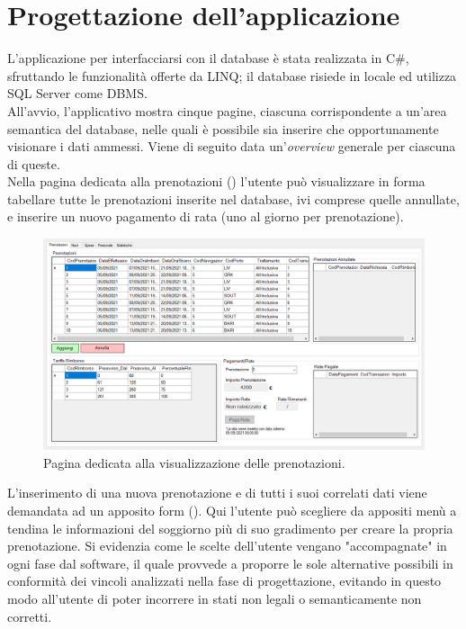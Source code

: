 \documentclass[a4paper, titlepage]{report}
\begin{document}
\chapter*{\LARGE {Progettazione dell'applicazione}}

L'applicazione per interfacciarsi con il database è stata realizzata in C\#, sfruttando le funzionalità offerte da LINQ; il database risiede in locale ed utilizza SQL Server come DBMS. \\

\noindent
All'avvio, l'applicativo mostra cinque pagine, ciascuna corrispondente a un'area semantica del database, nelle quali è possibile sia inserire che opportunamente visionare i dati ammessi. Viene di seguito data un'\textit{overview} generale per ciascuna di queste.\\

\noindent
Nella pagina dedicata alla prenotazioni () l'utente può visualizzare in forma tabellare tutte le prenotazioni inserite nel database, ivi comprese quelle annullate, e inserire un nuovo pagamento di rata (uno al giorno per prenotazione). \\

\begin{figure}[h]
\centering{}
\includegraphics[width=\textwidth]{images/screen-booking.PNG}
\caption{Pagina dedicata alla visualizzazione delle prenotazioni.}
\label{img:screen-booking}
\end{figure}

\noindent
L'inserimento di una nuova prenotazione e di tutti i suoi correlati dati viene demandata ad un apposito form (). Qui l'utente può scegliere da appositi menù a tendina le informazioni del soggiorno più di suo gradimento per creare la propria prenotazione. Si evidenzia come le scelte dell'utente vengano "accompagnate" in ogni fase dal software, il quale provvede a proporre le sole alternative possibili in conformità dei vincoli analizzati nella fase di progettazione, evitando in questo modo all'utente di poter incorrere in stati non legali o semanticamente non corretti.
\end{document}
